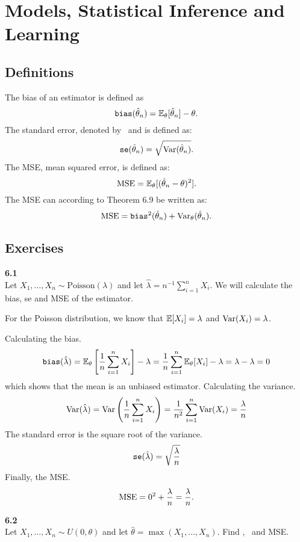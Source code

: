 
\newpage
\section{Models, Statistical Inference and Learning}

\subsection*{Definitions}
\noindent The bias of an estimator is defined as
$$
\texttt{bias}(\hat{\theta}_n) = \mathbb{E}_\theta[\hat{\theta}_n] - \theta.
$$
The standard error, denoted by \se\, and is defined as:
$$
\texttt{se}(\hat{\theta}_n) = \sqrt{\text{Var}(\hat{\theta}_n)}.
$$
The MSE, mean squared error, is defined as:
$$
\text{MSE} = \mathbb{E}_\theta[(\hat{\theta}_n - \theta)^2].
$$
The MSE can according to Theorem 6.9 be written as:
$$
\text{MSE} = \texttt{bias}^2(\hat{\theta}_n) + \text{Var}_\theta(\hat{\theta}_n).
$$

\subsection*{Exercises}

\bigskip\noindent
\textbf{6.1}\\  %
Let $X_1,\ldots,X_n\sim\text{Poisson}(\lambda)$ and let
$\hat{\lambda} = n^{-1}\sum_{i=1}^nX_i$. We will calculate the bias, se and MSE
of the estimator.

For the Poisson distribution, we know that $\mathbb{E}[X_i] = \lambda$ and $\text{Var}(X_i) = \lambda$.

\medskip\noindent Calculating the bias.
$$
\texttt{bias}(\hat{\lambda}) = \mathbb{E}_\theta\left[\frac{1}{n}\sum_{i=1}^nX_i\right] - \lambda
= \frac{1}{n}\sum_{i=1}^n\mathbb{E}_\theta[X_i] - \lambda = \lambda - \lambda = 0
$$
which shows that the mean is an unbiased estimator. Calculating the variance.
$$
\text{Var}(\hat{\lambda}) = \text{Var}\left(\frac{1}{n}\sum_{i=1}^nX_i\right) =
\frac{1}{n^2}\sum_{i=1}^n\text{Var}(X_i) = \frac{\lambda}{n}
$$
The standard error is the square root of the variance.
$$
\texttt{se}(\hat{\lambda}) = \sqrt{\frac{\lambda}{n}}
$$
Finally, the MSE.
$$
\text{MSE} = 0^2 + \frac{\lambda}{n} = \frac{\lambda}{n}.
$$

\newpage\noindent
\textbf{6.2}\\  %
Let $X_1,\ldots,X_n \sim U(0,\theta)$ and let $\hat{\theta} = \max(X_1,\ldots, X_n)$.
Find \bias, \se\, and MSE.

